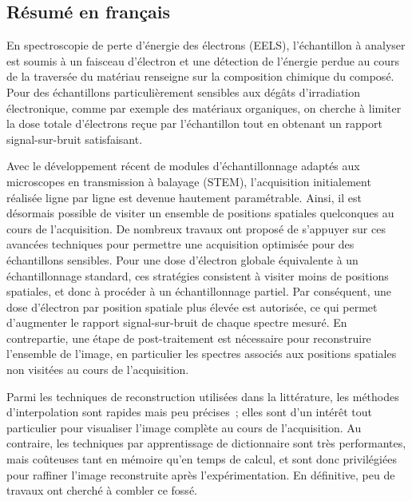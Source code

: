 \begin{fullwidth}

\chapter*{Résumé en français}
\label{ch:french_resume}

En spectroscopie de perte d’énergie des électrons (EELS), l’échantillon à analyser est soumis à un faisceau d’électron et une détection de l’énergie perdue au cours de la traversée du matériau renseigne sur la composition chimique du composé. Pour des échantillons particulièrement sensibles aux dégâts d'irradiation électronique, comme par exemple des matériaux organiques, on cherche à limiter la dose totale d'électrons reçue par l'échantillon tout en obtenant un rapport signal-sur-bruit satisfaisant.

Avec le développement récent de modules d’échantillonnage adaptés aux microscopes en transmission à balayage (STEM), l’acquisition initialement réalisée ligne par ligne est devenue hautement paramétrable. Ainsi, il est désormais possible de visiter un ensemble de positions spatiales quelconques au cours de l’acquisition. De nombreux travaux ont proposé de s’appuyer sur ces avancées techniques pour permettre une acquisition optimisée pour des échantillons sensibles. Pour une dose d’électron globale équivalente à un échantillonnage standard, ces stratégies consistent à visiter moins de positions spatiales, et donc à procéder à un échantillonnage partiel. Par conséquent, une dose d’électron par position spatiale plus élevée est autorisée, ce qui permet d’augmenter le rapport signal-sur-bruit de chaque spectre mesuré. En contrepartie, une étape de post-traitement est nécessaire pour reconstruire l’ensemble de l’image, en particulier les spectres associés aux positions spatiales non visitées au cours de l’acquisition.

Parmi les techniques de reconstruction utilisées dans la littérature, les méthodes d’interpolation sont rapides mais peu précises~; elles sont d’un intérêt tout particulier pour visualiser l’image complète au cours de l’acquisition. Au contraire, les techniques par apprentissage de dictionnaire sont très performantes, mais coûteuses tant en mémoire qu’en temps de calcul, et sont donc privilégiées pour raffiner l’image reconstruite après l’expérimentation. En définitive, peu de travaux ont cherché à combler ce fossé.


\end{fullwidth}
